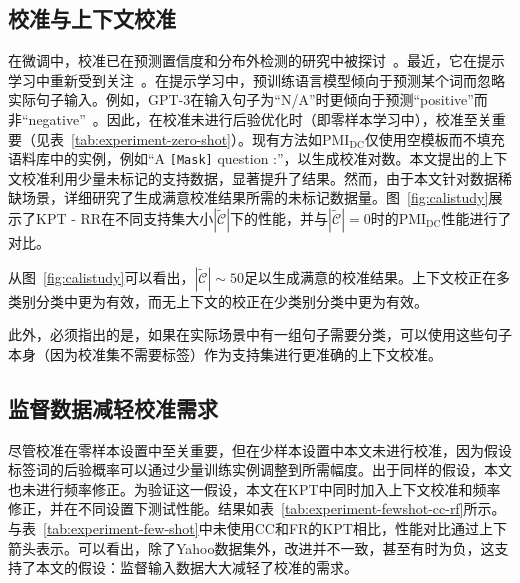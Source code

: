 \subsection{校准与上下文校准}
\label{app:supportsize}
在微调中，校准已在预测置信度和分布外检测的研究中被探讨~\cite{kong-etal-2020-calibrated}。最近，它在提示学习中重新受到关注~\cite{pmlr-v139-zhao21c, holtzman2021surface}。在提示学习中，预训练语言模型倾向于预测某个词而忽略实际句子输入。例如，GPT-3在输入句子为“N/A”时更倾向于预测“positive”而非“negative”~\cite{pmlr-v139-zhao21c}。因此，在校准未进行后验优化时（即零样本学习中），校准至关重要（见表~\ref{tab:experiment-zero-shot}）。现有方法如$\text{PMI}_\text{DC}$仅使用空模板而不填充语料库中的实例，例如“A \texttt{[Mask]} question :”，以生成校准对数。本文提出的上下文校准利用少量未标记的支持数据，显著提升了结果。然而，由于本文针对数据稀缺场景，详细研究了生成满意校准结果所需的未标记数据量。图~\ref{fig:calistudy}展示了KPT - RR在不同支持集大小$|\tilde{\mathcal{C}}|$下的性能，并与$|\tilde{\mathcal{C}}|=0$时的$\text{PMI}_\text{DC}$性能进行了对比。

从图~\ref{fig:calistudy}可以看出，$|\tilde{\mathcal{C}}|\sim 50$足以生成满意的校准结果。上下文校正在多类别分类中更为有效，而无上下文的校正在少类别分类中更为有效。

此外，必须指出的是，如果在实际场景中有一组句子需要分类，可以使用这些句子本身（因为校准集不需要标签）作为支持集进行更准确的上下文校准。

\subsection{监督数据减轻校准需求}
\label{app:fewshot-cali}
尽管校准在零样本设置中至关重要，但在少样本设置中本文未进行校准，因为假设标签词的后验概率可以通过少量训练实例调整到所需幅度。出于同样的假设，本文也未进行频率修正。为验证这一假设，本文在KPT中同时加入上下文校准和频率修正，并在不同设置下测试性能。结果如表~\ref{tab:experiment-fewshot-cc-rf}所示。与表~\ref{tab:experiment-few-shot}中未使用CC和FR的KPT相比，性能对比通过上下箭头表示。可以看出，除了Yahoo数据集外，改进并不一致，甚至有时为负，这支持了本文的假设：监督输入数据大大减轻了校准的需求。

